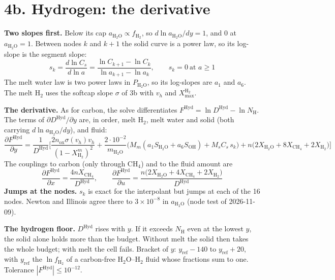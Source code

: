 \documentclass[11pt]{article}
\newcommand{\fHt}{f_{\mathrm{H_2}}}
\newcommand{\aw}{a_{\mathrm{H_2O}}}
\newcommand{\mW}{m_{\mathrm{H_2O}}}
\newcommand{\nox}{n_{\mathrm{ox}}}
\newcommand{\Xm}[1]{X^{m}_{\mathrm{#1}}}
\begin{document}
\section*{4b. Hydrogen: the derivative}
\vspace*{\fill}
\begin{minipage}[t]{\linewidth}\vspace{0pt}\small\setlength{\abovedisplayskip}{13pt}\setlength{\belowdisplayskip}{13pt}\setlength{\abovedisplayshortskip}{13pt}\setlength{\belowdisplayshortskip}{13pt}
\textbf{Two slopes first.} Below its cap $\aw\propto\fHt$, so $d\ln\aw/dy=1$, and 0 at $\aw=1$. Between nodes $k$ and $k+1$ the solid curve is a power law, so its log-slope is the segment slope:
\begin{equation}
  s_k=\frac{d\ln C_s}{d\ln a}=\frac{\ln C_{k+1}-\ln C_k}{\ln a_{k+1}-\ln a_k},\qquad s_k=0\ \text{at }a\ge1
\end{equation}
The melt water law is two power laws in $P_{\mathrm{H_2O}}$, so its log-slopes are $a_1$ and $a_6$. The melt H$_2$ uses the softcap slope $\sigma$ of 3b with $v_h$ and $X^{\mathrm H_2}_{\max}$.

\textbf{The derivative.} As for carbon, the solve differentiates $F^{\mathrm{Hyd}}=\ln D^{\mathrm{Hyd}}-\ln N_{\mathrm H}$. The terms of $\partial D^{\mathrm{Hyd}}/\partial y$ are, in order, melt H$_2$, melt water and solid (both carrying $d\ln\aw/dy$), and fluid:
\begin{equation}
  \frac{\partial F^{\mathrm{Hyd}}}{\partial y}=\frac{1}{D^{\mathrm{Hyd}}}\Big[\frac{2\nox\sigma(v_h)v_h}{(1-\Xm{H_2})^2}
  +\frac{2\cdot10^{-2}}{\mW}\big(M_m(a_1S_{\mathrm{H_2O}}+a_6S_{\mathrm{OH}})+M_sC_s\,s_k\big)
  +n\big(2X_{\mathrm{H_2O}}+8X_{\mathrm{CH_4}}+2X_{\mathrm{H_2}}\big)\Big]
\end{equation}
The couplings to carbon (only through CH$_4$) and to the fluid amount are
\begin{equation}
  \frac{\partial F^{\mathrm{Hyd}}}{\partial x}=\frac{4nX_{\mathrm{CH_4}}}{D^{\mathrm{Hyd}}},\qquad
  \frac{\partial F^{\mathrm{Hyd}}}{\partial u}=\frac{n\big(2X_{\mathrm{H_2O}}+4X_{\mathrm{CH_4}}+2X_{\mathrm{H_2}}\big)}{D^{\mathrm{Hyd}}}
\end{equation}
\textbf{Jumps at the nodes.} $s_k$ is exact for the interpolant but jumps at each of the 16 nodes. Newton and Illinois agree there to $3\times10^{-8}$ in $\aw$ (node test of 2026-11-09).

\textbf{The hydrogen floor.} $D^{\mathrm{Hyd}}$ rises with $y$. If it exceeds $N_{\mathrm H}$ even at the lowest $y$, the solid alone holds more than the budget. Without melt the solid then takes the whole budget; with melt the cell fails. Bracket of $y$: $y_{\mathrm{ref}}-140$ to $y_{\mathrm{ref}}+20$, with $y_{\mathrm{ref}}$ the $\ln\fHt$ of a carbon-free H$_2$O--H$_2$ fluid whose fractions sum to one. Tolerance $|F^{\mathrm{Hyd}}|\le10^{-12}$.
\end{minipage}
\end{document}
